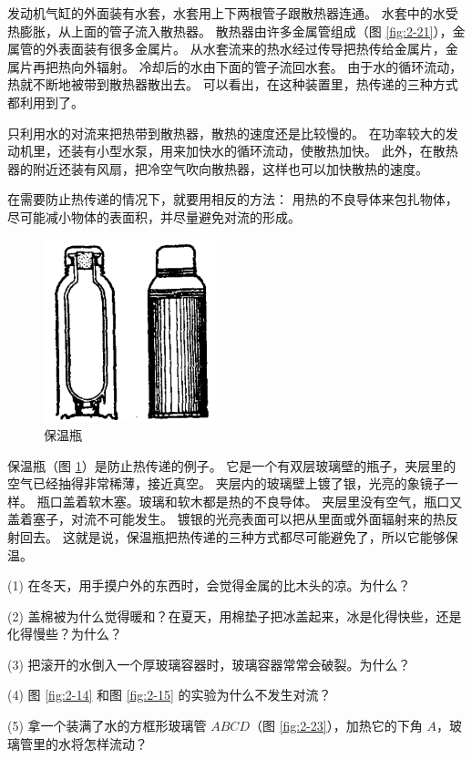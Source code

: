 发动机气缸的外面装有水套，水套用上下两根管子跟散热器连通。
水套中的水受热膨胀，从上面的管子流入散热器。
散热器由许多金属管组成（图 \ref{fig:2-21}），金属管的外表面装有很多金属片。
从水套流来的热水经过传导把热传给金属片，金属片再把热向外辐射。
冷却后的水由下面的管子流回水套。
由于水的循环流动，热就不断地被带到散热器散出去。
可以看出，在这种装置里，热传递的三种方式都利用到了。

只利用水的对流来把热带到散热器，散热的速度还是比较慢的。
在功率较大的发动机里，还装有小型水泵，用来加快水的循环流动，使散热加快。
此外，在散热器的附近还装有风扇，把冷空气吹向散热器，这样也可以加快散热的速度。

在需要防止热传递的情况下，就要用相反的方法：
用热的不良导体来包扎物体，尽可能减小物体的表面积，并尽量避免对流的形成。

\begin{figure}
    \centering
    \includegraphics[width=5cm]{../pic/czwl2-ch2-22}
    \caption{保温瓶}\label{fig:2-22}
\end{figure}


保温瓶（图 \ref{fig:2-22}）是防止热传递的例子。
它是一个有双层玻璃壁的瓶子，夹层里的空气已经抽得非常稀薄，接近真空。
夹层内的玻璃壁上镀了银，光亮的象镜子一样。
瓶口盖着软木塞。玻璃和软木都是热的不良导体。
夹层里没有空气，瓶口又盖着塞子，对流不可能发生。
镀银的光亮表面可以把从里面或外面辐射来的热反射回去。
这就是说，保温瓶把热传递的三种方式都尽可能避免了，所以它能够保温。



\lianxi

(1) 在冬天，用手摸户外的东西时，会觉得金属的比木头的凉。为什么？

(2) 盖棉被为什么觉得暖和？在夏天，用棉垫子把冰盖起来，冰是化得快些，还是化得慢些？为什么？

(3) 把滚开的水倒入一个厚玻璃容器时，玻璃容器常常会破裂。为什么？

(4) 图 \ref{fig:2-14} 和图 \ref{fig:2-15} 的实验为什么不发生对流？

(5) 拿一个装满了水的方框形玻璃管 $ABCD$（图 \ref{fig:2-23}），加热它的下角 $A$，玻璃管里的水将怎样流动？

